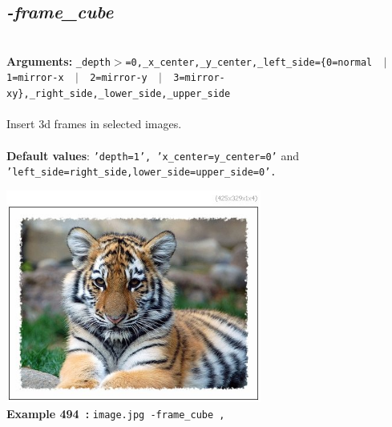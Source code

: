 \documentclass[a4paper,11pt,twoside]{book}
\begin{document}
\subsection{\emph{-frame\_cube} }\vspace*{-0.5em}
~\\\textbf{Arguments: } 
{\small \texttt{\_depth$>$=0,\_x\_center,\_y\_center,\_left\_side=\{0=normal ~$|$~ 1=mirror-x ~$|$~ 2=mirror-y ~$|$~ 3=mirror-xy\},\_right\_side,\_lower\_side,\_upper\_side}}\\~\\
Insert 3d frames in selected images.
~\\~\\\textbf{Default values}: {\small \texttt{'depth=1', 'x\_center=y\_center=0'} and \texttt{'left\_side=right\_side,lower\_side=upper\_side=0'.}}
\begin{center}\includegraphics[keepaspectratio=true,height=7cm,width=\textwidth]{img/gmic_def494.jpg}\\
{\footnotesize \textbf{Example 494~:} \texttt{image.jpg -frame\_cube ,}}
\end{center}
\end{document}

